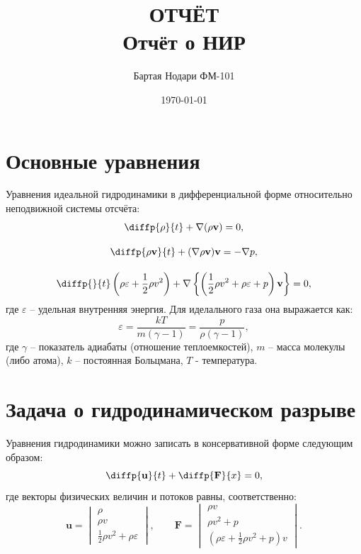 \documentclass[a4paper]{article}
\author{Бартая Нодари ФМ-101}
\title{ОТЧЁТ\\ Отчёт о НИР}
\date{\today}
\begin{document}
	\section{Основные уравнения}
	Уравнения идеальной гидродинамики в дифференциальной форме относительно неподвижной системы отсчёта:
	\begin{gather}
		\diffp{\rho}{t} + \nabla ( \rho \mathbf{v} ) = 0 ,	\\[10pt]
		\diffp{\rho \mathbf{v}}{t} + (\nabla \rho \mathbf{v}) \mathbf{v} = -\nabla p ,	\\[10pt]
		\diffp{}{t}\left(\rho \varepsilon + \frac{1}{2} \rho v^2 \right) + 
						\nabla \left\{ \left( \frac{1}{2} \rho v^2 + \rho \varepsilon + p \right)\mathbf{v}\right\} = 0 ,
	\end{gather}
	где $\varepsilon$ -- удельная внутренняя энергия. Для иделального газа она выражается как:
	\begin{equation}
		\varepsilon = \dfrac{kT}{m(\gamma-1)} = \dfrac{p}{\rho (\gamma - 1)} ,
	\end{equation}
	где $\gamma$ -- показатель адиабаты (отношение теплоемкостей), $m$ -- масса молекулы (либо атома), $k$ -- постоянная Больцмана, $T$ - температура. 

	\section{Задача о гидродинамическом разрыве}
	Уравнения гидродинамики можно записать в консервативной форме следующим образом:
	\begin{equation}
		\diffp{\mathbf{u}}{t} + \diffp{\mathbf{F}}{x} = 0 ,
	\end{equation}
	где векторы физических величин и потоков равны, соответственно:
	\begin{equation}
	\mathbf{u}	=	\begin{vmatrix}
						\rho								\\
						\rho v								\\
						\frac{1}{2}\rho v^2 + \rho \varepsilon		
					\end{vmatrix} , \qquad	
	\mathbf{F}	=	\begin{vmatrix}
						\rho v								\\
						\rho v^2 + p								\\
						\left(\rho \varepsilon + \frac{1}{2}\rho v^2 + p\right)v	
	\end{vmatrix}	.		
	\end{equation}
	
\end{document}
